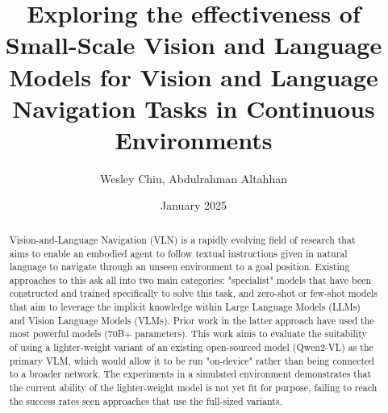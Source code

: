\documentclass{svproc}
\title{Exploring the effectiveness of Small-Scale Vision and Language Models for Vision and Language Navigation Tasks in Continuous Environments}
\author{Wesley Chiu, Abdulrahman Altahhan}
\institute{University of Leeds, School of Computing, ODL MSc in AI, UK.}
\date{January 2025}
\begin{document}
\maketitle

\begin{abstract}
    Vision-and-Language Navigation (VLN) is a rapidly evolving field of research that aims to enable an embodied agent to follow textual instructions given in natural language to navigate through an unseen environment to a goal position. Existing approaches to this ask all into two main categories: "specialist" models that have been constructed and trained specifically to solve this task, and zero-shot or few-shot models that aim to leverage the implicit knowledge within Large Language Models (LLMs) and Vision Language Models  (VLMs). Prior work in the latter approach have used the most powerful models (70B+ parameters). This work aims to evaluate the suitability of using a lighter-weight variant of an existing open-sourced model (Qwen2-VL) as the primary VLM, which would allow it to be run "on-device" rather than being connected to a broader network. The experiments in a simulated environment demonstrates that the current ability of the lighter-weight model is not yet fit for purpose, failing to reach the success rates 
    seen approaches that use the full-sized variants.
    
\end{abstract}
\end{document}
